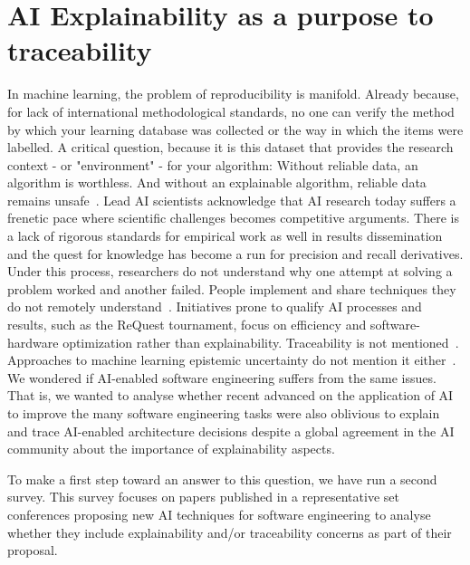 \section{AI Explainability as a purpose to traceability}
\label{sec:explainability}

In machine learning, the problem of reproducibility is manifold. Already because, for lack of international methodological standards, no one can verify the method by which your learning database was collected or the way in which the items were labelled. 
A critical question, because it is this dataset that provides the research context - or "environment" - for your algorithm: Without reliable data, an algorithm is worthless. And without an explainable algorithm, reliable data remains unsafe~\cite{beam2020-ai-reproduciblity-in-health,avital2018-realistic-evaluation-of-ai}. 
Lead AI scientists acknowledge that AI research today suffers a frenetic pace where scientific challenges becomes competitive arguments. There is a lack of rigorous standards for empirical work as well in results dissemination and the quest for knowledge has become a run for precision and recall derivatives. Under this process, researchers do not understand why one attempt at solving a problem worked and another failed. People implement and share techniques they do not remotely understand~\cite{sculley2018-winners-curse-progress-empirical-rigor}. Initiatives prone to qualify AI processes and results, such as the ReQuest tournament, focus on efficiency and software-hardware optimization rather than explainability. Traceability is not mentioned~\cite{request2018}. Approaches to machine learning epistemic uncertainty do not mention it either~\cite{hllermeier2019-aleatoric-and-epistemic-uncertiainty-in-ml}.\\

We wondered if AI-enabled software engineering suffers from the same issues. That is, we wanted to analyse whether recent advanced on the application of AI to improve the many software engineering tasks were also oblivious to explain and trace AI-enabled architecture decisions despite a global agreement in the AI community about the importance of explainability aspects.

To make a first step toward an answer to this question, we have run a second survey. This survey focuses on papers published in a representative set conferences proposing new AI techniques for software engineering to analyse whether they include explainability and/or traceability concerns as part of their proposal.

